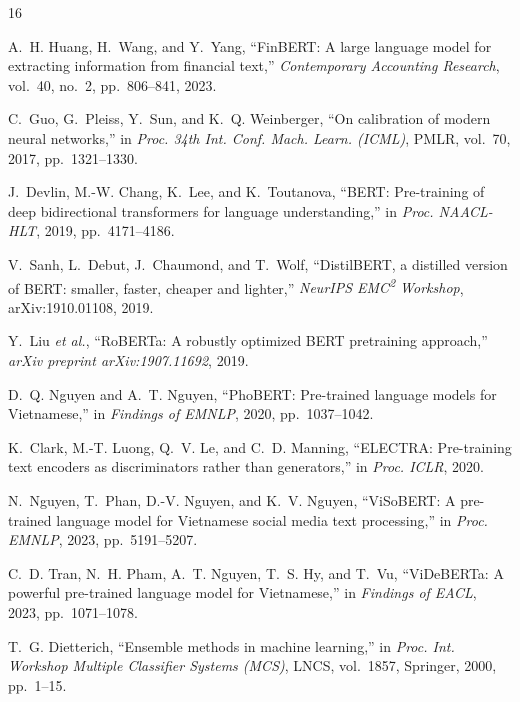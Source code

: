 \documentclass[journal,a4paper]{IEEEtran}
\begin{document}
\balance
\begin{thebibliography}{16}

A.~H. Huang, H.~Wang, and Y.~Yang, ``FinBERT: A large language model for extracting information from financial text,'' \textit{Contemporary Accounting Research}, vol.~40, no.~2, pp.~806--841, 2023.

C.~Guo, G.~Pleiss, Y.~Sun, and K.~Q. Weinberger, ``On calibration of modern neural networks,'' in \textit{Proc. 34th Int. Conf. Mach. Learn. (ICML)}, PMLR, vol.~70, 2017, pp.~1321--1330.

J.~Devlin, M.-W. Chang, K.~Lee, and K.~Toutanova, ``BERT: Pre-training of deep bidirectional transformers for language understanding,'' in \textit{Proc. NAACL-HLT}, 2019, pp.~4171--4186.

V.~Sanh, L.~Debut, J.~Chaumond, and T.~Wolf, ``DistilBERT, a distilled version of BERT: smaller, faster, cheaper and lighter,'' \textit{NeurIPS EMC\textsuperscript{2} Workshop}, arXiv:1910.01108, 2019.

Y.~Liu \textit{et al.}, ``RoBERTa: A robustly optimized BERT pretraining approach,'' \textit{arXiv preprint arXiv:1907.11692}, 2019.

D.~Q. Nguyen and A.~T. Nguyen, ``PhoBERT: Pre-trained language models for Vietnamese,'' in \textit{Findings of EMNLP}, 2020, pp.~1037--1042.

K.~Clark, M.-T. Luong, Q.~V. Le, and C.~D. Manning, ``ELECTRA: Pre-training text encoders as discriminators rather than generators,'' in \textit{Proc. ICLR}, 2020.

N.~Nguyen, T.~Phan, D.-V. Nguyen, and K.~V. Nguyen, ``ViSoBERT: A pre-trained language model for Vietnamese social media text processing,'' in \textit{Proc. EMNLP}, 2023, pp.~5191--5207.

C.~D. Tran, N.~H. Pham, A.~T. Nguyen, T.~S. Hy, and T.~Vu, ``ViDeBERTa: A powerful pre-trained language model for Vietnamese,'' in \textit{Findings of EACL}, 2023, pp.~1071--1078.

T.~G. Dietterich, ``Ensemble methods in machine learning,'' in \textit{Proc. Int. Workshop Multiple Classifier Systems (MCS)}, LNCS, vol.~1857, Springer, 2000, pp.~1--15.


\end{thebibliography}
\end{document}
